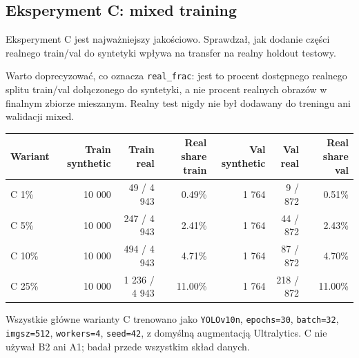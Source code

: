 \documentclass[
  11pt,
]{article}
\begin{document}
\hypertarget{eksperyment-c-mixed-training}{%
\subsection{Eksperyment C: mixed
training}\label{eksperyment-c-mixed-training}}

Eksperyment C jest najważniejszy jakościowo. Sprawdzał, jak dodanie
części realnego train/val do syntetyki wpływa na transfer na realny
holdout testowy.

Warto doprecyzować, co oznacza \texttt{real\_frac}: jest to procent
dostępnego realnego splitu train/val dołączonego do syntetyki, a nie
procent realnych obrazów w finalnym zbiorze mieszanym. Realny test nigdy
nie był dodawany do treningu ani walidacji mixed.

\begingroup
{}
\begin{tabularx}{\linewidth}{LRRRRRR}
\toprule
Wariant & Train synthetic & Train real & Real share train & Val
synthetic & Val real & Real share val \\
\midrule

\bottomrule

C 1\% & 10 000 & 49 / 4 943 & 0.49\% & 1 764 & 9 / 872 & 0.51\% \\
C 5\% & 10 000 & 247 / 4 943 & 2.41\% & 1 764 & 44 / 872 & 2.43\% \\
C 10\% & 10 000 & 494 / 4 943 & 4.71\% & 1 764 & 87 / 872 & 4.70\% \\
C 25\% & 10 000 & 1 236 / 4 943 & 11.00\% & 1 764 & 218 / 872 &
11.00\% \\
\end{tabularx}
\endgroup


Wszystkie główne warianty C trenowano jako \texttt{YOLOv10n},
\texttt{epochs=30}, \texttt{batch=32}, \texttt{imgsz=512},
\texttt{workers=4}, \texttt{seed=42}, z domyślną augmentacją
Ultralytics. C nie używał B2 ani A1; badał przede wszystkim skład
danych.

\begingroup
{}
\noindent{}
\endgroup
\end{document}
